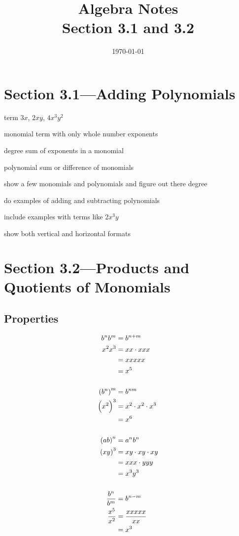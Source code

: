 \documentclass[letterpaper, landscape]{exam}
\title{Algebra Notes \\ Section 3.1 and 3.2 }
\author{}
\date{\today}
\begin{document}
  \maketitle

  \section{Section 3.1---Adding Polynomials}

  \begin{description*}
    \item[term] $3x$, $2xy$, $4x^3y^2$
    \item[monomial] term with only whole number exponents
    \item[degree] sum of exponents in a monomial
    \item[polynomial] sum or difference of monomials
  \end{description*}

  \begin{itemize*}
    \item show a few monomials and polynomials and figure out there degree
    \item do examples of adding and subtracting polynomials
    \item include examples with terms like $2x^3y$
    \item show both vertical and horizontal formats
  \end{itemize*}

  \section{Section 3.2---Products and Quotients of Monomials} %

  \subsection{Properties} %
  
  \begin{align*}
    b^n b^m & = b^{n + m} \\
    x^2 x^3 & = xx \cdot xxx \\
            & = xxxxx \\
            & = x^5 \\
    \\
    \del{b^n}^m & = b^{nm} \\
    \del{x^2}^3 & = x^2 \cdot x^2 \cdot x^3 \\
                & = x^6 \\
    \\
    \del{ab}^n & = a^n b^n \\
    \del{xy}^3 & = xy \cdot xy \cdot xy \\
               & = xxx \cdot yyy \\
               & = x^3 y^3 \\
    \\
    \frac{b^n}{b^m} & = b^{n - m} \\
    \frac{x^5}{x^2} & = \frac{xxxxx}{xx} \\
                    & = x^3 \\
  \end{align*}
  
\end{document}
